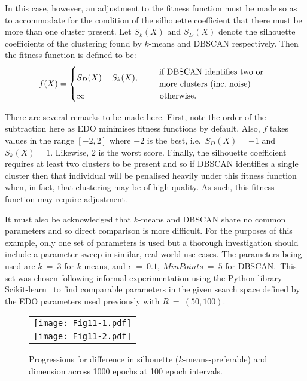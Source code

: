 \documentclass[11pt]{article}
\newlength{\imgwidth}
\begin{document}
In this case, however, an adjustment to the fitness function must be made so as
to accommodate for the condition of the silhouette coefficient that there must
be more than one cluster present. Let \(S_k (X)\) and \(S_D (X)\) denote the
silhouette coefficients of the clustering found by \(k\)-means and DBSCAN
respectively. Then the fitness function is defined to be:
\begin{equation}
    f(X) = 
        \begin{cases}
            S_D (X) - S_k (X), &\quad \text{%
                \begin{tabular}{l}%
                    if DBSCAN identifies two or
                    \\
                    more clusters (inc.\ noise)
                \end{tabular}
            }\\
            \infty &\quad \ \ \text{otherwise.}
        \end{cases}\label{eq:dbscan-fitness}
\end{equation}

There are several remarks to be made here. First, note the order of the
subtraction here as EDO minimises fitness functions by default. Also, \(f\)
takes values in the range \([-2, 2]\) where \(-2\) is the best, i.e.\ \(S_D(X) =
-1\) and \(S_k(X) = 1\). Likewise, 2 is the worst score. Finally, the silhouette
coefficient requires at least two clusters to be present and so if DBSCAN
identifies a single cluster then that individual will be penalised heavily under
this fitness function when, in fact, that clustering may be of high quality. As
such, this fitness function may require adjustment.

It must also be acknowledged that \(k\)-means and DBSCAN share no common
parameters and so direct comparison is more difficult. For the purposes of this
example, only one set of parameters is used but a thorough investigation should
include a parameter sweep in similar, real-world use cases. The parameters being
used are \(k~=~3\) for \(k\)-means, and \(\epsilon~=~0.1,\ MinPoints~=~5\) for
DBSCAN.\ This set was chosen following informal experimentation using the Python
library Scikit-learn~\cite{scikit} to find comparable parameters in the given
search space defined by the EDO parameters used previously with
\(R~=~(50,100)\).

\begin{figure}[htbp]
    \centering
    \begin{tabular}{c}
        \texttt{[image: Fig11-1.pdf]}
        \\
        \texttt{[image: Fig11-2.pdf]}
    \end{tabular}
    \caption{%
        Progressions for difference in silhouette (\(k\)-means-preferable) and
        dimension across 1000 epochs at 100 epoch intervals.
    }\label{fig:dbscan-silhouette}
\end{figure}
\end{document}
